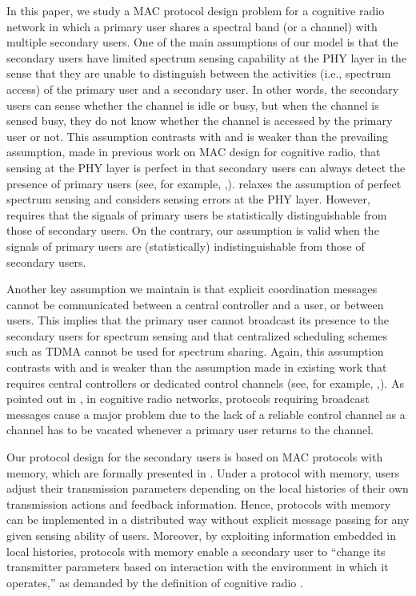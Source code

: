 \documentclass[12pt,draftclsnofoot,onecolumn]{IEEEtran}
\begin{document}
In this paper, we study a MAC protocol design problem for a cognitive radio
network in which a primary user shares a spectral band (or a channel) with
multiple secondary users. One of the main assumptions of our model is that
the secondary users have limited spectrum sensing capability at the PHY layer in the sense that
they are unable to distinguish between the activities (i.e., spectrum access) of
the primary user and a secondary user.
In other words, the secondary users can sense whether the channel is idle or busy,
but when the channel is sensed busy, they do not know whether the channel is accessed
by the primary user or not.
This assumption contrasts with and is weaker than the prevailing assumption, made
in previous work on MAC design for cognitive radio, that sensing at the PHY layer is perfect
in that secondary users can always detect the presence of primary users (see, for example, \cite{chou},\cite{fattahi}).
\cite{zhao} relaxes the assumption of perfect spectrum sensing and considers sensing
errors at the PHY layer. However,
\cite{zhao} requires that the signals of primary users be statistically distinguishable from
those of secondary users. On the contrary, our assumption is valid when the signals of
primary users are (statistically) indistinguishable from
those of secondary users.

Another key assumption we maintain is that explicit coordination messages cannot be communicated
between a central controller and a user, or between users.
This implies that the primary user cannot broadcast its presence to the secondary users
for spectrum sensing
and that centralized scheduling schemes such as TDMA cannot be used
for spectrum sharing. Again, this assumption contrasts with and is weaker than
the assumption made in existing work that requires central controllers or
dedicated control channels (see, for example, \cite{chou},\cite{fattahi}). As pointed out in
\cite{akyildiz}, in cognitive radio networks, protocols requiring broadcast
messages cause a major problem due to the lack of a reliable control channel
as a channel has to be vacated whenever a primary user returns to the channel.

Our protocol design for the secondary users is based on MAC protocols
with memory, which are formally presented in \cite{park}. Under a
protocol with memory, users adjust their transmission parameters depending
on the local histories of their own transmission actions and feedback
information. Hence, protocols with memory can be implemented in a distributed way without
explicit message passing for any given sensing ability of users.
Moreover, by exploiting information embedded in local histories,
protocols with memory enable a secondary user to ``change its
transmitter parameters based on interaction with the environment
in which it operates,'' as demanded by the definition of cognitive radio \cite{FCC}.
\end{document}
